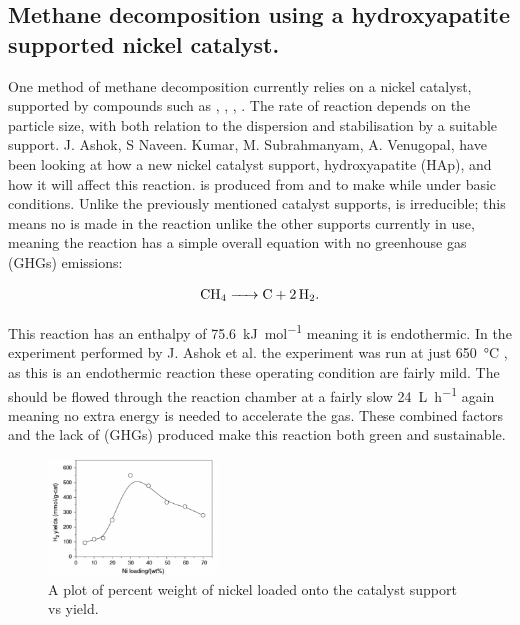 \subsection{Methane decomposition using a hydroxyapatite supported nickel catalyst.}%
\label{sub:methane_decomposition_using_a_hydroxyapatite_supported_nickel_catalyst_}

One method of methane decomposition currently relies on a nickel catalyst, supported by compounds such as , , , . The rate of reaction depends on the  particle size, with both relation to the dispersion and stabilisation by a suitable support. \cite{Ashok}
 J. Ashok, S Naveen. Kumar, M. Subrahmanyam, A. Venugopal, have been looking at how a new nickel catalyst support, hydroxyapatite (HAp), and how it will affect this reaction.  is produced from  and  to make \ce{[Ca5(PO4)3(OH)]} while under basic conditions.\cite{Ashok}
Unlike the previously mentioned catalyst supports,  is irreducible; this means no  is made in the reaction unlike the other supports currently in use, meaning the reaction has a simple overall equation with no greenhouse gas (GHGs) emissions:

\begin{align}
	\ce{CH4 -> C +2H2}
.\end{align}

This reaction has an enthalpy of \SI{75.6}{\kilo\joule\per\mole} meaning it is endothermic. In the experiment performed by J. Ashok et al. the experiment was run at just \SI{650}{\celsius} \cite{Ashok}, as this is an endothermic reaction these operating condition are fairly mild. The  should be flowed through the reaction chamber at a fairly slow \SI{24}{\liter\per\hour} \cite{Ashok} again meaning no extra energy is needed to accelerate the gas. These combined factors and the lack of (GHGs) produced make this reaction both green and sustainable.

\begin{figure}[H]
	\centering
	\includegraphics[width=0.4\textwidth]{539a7840-2cb8-11eb-895f-8c8590753a48.png}
	\caption{A plot of percent weight of nickel loaded onto the catalyst support vs  yield.}  
	\label{fig:MD_plot1}
\end{figure}


